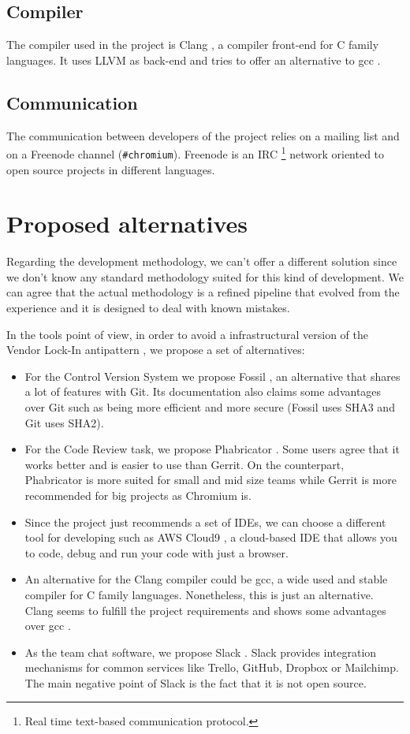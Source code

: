 \subsection{Compiler}

The compiler used in the project is Clang \cite{clang}, a compiler front-end for C family languages. It uses LLVM as back-end and tries to offer an alternative to gcc \cite{gcc}.

\subsection{Communication}

The communication between developers of the project relies on a mailing list and on a Freenode \cite{freenode} channel (\texttt{\#chromium}). Freenode is an IRC \footnote{Real time text-based communication protocol.} network oriented to open source projects in different languages.


\section{Proposed alternatives}

Regarding the development methodology, we can't offer a different solution since we don't know any standard methodology suited for this kind of development. We can agree that the actual methodology is a refined pipeline that evolved from the experience and it is designed to deal with known mistakes.

In the tools point of view, in order to avoid a infrastructural version of the Vendor Lock-In antipattern \cite{lockin}, we propose a set of alternatives:
\begin{itemize}
    \item For the Control Version System we propose Fossil \cite{fossil}, an alternative that shares a lot of features with Git. Its documentation also claims some advantages over Git \cite{fossilvsgit} such as being more efficient and more secure (Fossil uses SHA3 and Git uses SHA2).
    \item For the Code Review task, we propose Phabricator \cite{phabricator}. Some users agree that it works better and is easier to use than Gerrit. On the counterpart, Phabricator is more suited for small and mid size teams while Gerrit is more recommended for big projects as Chromium is.
    \item Since the project just recommends a set of IDEs, we can choose a different tool for developing such as AWS Cloud9 \cite{awscloud9}, a cloud-based IDE that allows you to code, debug and run your code with just a browser.
    \item An alternative for the Clang compiler could be gcc, a wide used and stable compiler for C family languages. Nonetheless, this is just an alternative. Clang seems to fulfill the project requirements and shows some advantages over gcc \cite{clangvsgcc}.
    \item As the team chat software, we propose Slack \cite{slack}. Slack provides integration mechanisms for common services like Trello, GitHub, Dropbox or Mailchimp. The main negative point of Slack is the fact that it is not open source.
\end{itemize}